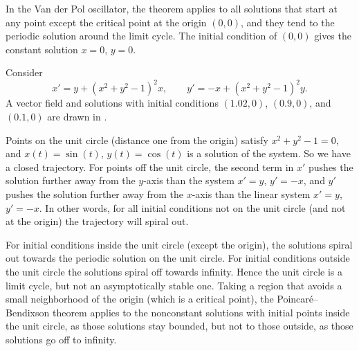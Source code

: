 In the Van der Pol oscillator,
the theorem applies to
all solutions that start at any point except the critical point at the origin $(0,0)$,
and they tend to the
periodic solution around the limit cycle.
The initial condition
of $(0,0)$ gives the constant solution $x=0$, $y=0$.

\begin{example}
\label{example:repellingpointlimitcycle}
Consider
\begin{equation*}
x' = y + {(x^2+y^2-1)}^2 x, \qquad
y' = -x + {(x^2+y^2-1)}^2 y.
\end{equation*}
A vector field and solutions with initial conditions
$(1.02,0)$, $(0.9,0)$, and $(0.1,0)$ are drawn in
.

\begin{myfig}
\capstart
{}
\caption{Unstable limit cycle example.\label{fig:nlin-unstable-limit-cycle}}
\end{myfig}

Points on the unit circle (distance one from the origin)
satisfy $x^2+y^2-1=0$, and $x(t) = \sin(t)$, $y(t) = \cos(t)$ is a solution of the system.
So we have a closed trajectory.
For points off the unit circle, the second term in
$x'$ pushes the solution further
away from the $y$-axis than the system $x' = y$, $y' = -x$,
and $y'$ pushes the solution further away from the $x$-axis
than the linear system $x'=y$, $y' = -x$.
In other words, for all
initial conditions not on the unit circle
(and not at the origin) the trajectory will spiral out.

For initial conditions inside the unit circle (except the origin), the
solutions
spiral out towards the periodic solution on the unit circle.
For initial conditions outside the unit circle the solutions spiral off
towards infinity.
Hence the unit circle is a limit cycle, but
not an asymptotically stable one.
Taking a region that avoids a small neighborhood
of the origin (which is a critical point),
the Poincar\'e--Bendixson theorem applies to the nonconstant
solutions with initial points inside
the unit circle, as those solutions stay bounded, but not to those outside,
as those solutions go off to infinity.
\end{example}

